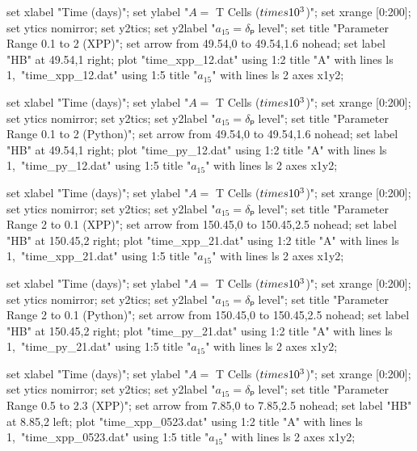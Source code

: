   set xlabel "Time (days)";
  set ylabel "$A = $ T Cells ($\\times 10^3$)";
  set xrange [0:200];
  set ytics nomirror;
  set y2tics;
  set y2label "$a_{15} = δₚ$ level";
  set title "Parameter Range 0.1 to 2 (XPP)";
  set arrow from 49.54,0 to 49.54,1.6 nohead;
  set label "HB" at 49.54,1 right;
  plot "time_xpp_12.dat" using 1:2 title "A" with lines ls 1,\
       "time_xpp_12.dat" using 1:5 title "$a_{15}$" with lines ls 2 axes x1y2;
\stopGNUPLOTscript

\startGNUPLOTscript[time_py_12]
  set xlabel "Time (days)";
  set ylabel "$A = $ T Cells ($\\times 10^3$)";
  set xrange [0:200];
  set ytics nomirror;
  set y2tics;
  set y2label "$a_{15} = δₚ$ level";
  set title "Parameter Range 0.1 to 2 (Python)";
  set arrow from 49.54,0 to 49.54,1.6 nohead;
  set label "HB" at 49.54,1 right;
  plot "time_py_12.dat" using 1:2 title "A" with lines ls 1,\
       "time_py_12.dat" using 1:5 title "$a_{15}$" with lines ls 2 axes x1y2;
\stopGNUPLOTscript

  set xlabel "Time (days)";
  set ylabel "$A = $ T Cells ($\\times 10^3$)";
  set xrange [0:200];
  set ytics nomirror;
  set y2tics;
  set y2label "$a_{15} = δₚ$ level";
  set title "Parameter Range 2 to 0.1 (XPP)";
  set arrow from 150.45,0 to 150.45,2.5 nohead;
  set label "HB" at 150.45,2 right;
  plot "time_xpp_21.dat" using 1:2 title "A" with lines ls 1,\
       "time_xpp_21.dat" using 1:5 title "$a_{15}$" with lines ls 2 axes x1y2;
\stopGNUPLOTscript

\startGNUPLOTscript[time_py_21]
  set xlabel "Time (days)";
  set ylabel "$A = $ T Cells ($\\times 10^3$)";
  set xrange [0:200];
  set ytics nomirror;
  set y2tics;
  set y2label "$a_{15} = δₚ$ level";
  set title "Parameter Range 2 to 0.1 (Python)";
  set arrow from 150.45,0 to 150.45,2.5 nohead;
  set label "HB" at 150.45,2 right;
  plot "time_py_21.dat" using 1:2 title "A" with lines ls 1,\
       "time_py_21.dat" using 1:5 title "$a_{15}$" with lines ls 2 axes x1y2;
\stopGNUPLOTscript

\startGNUPLOTscript[time_xpp_0523]
  set xlabel "Time (days)";
  set ylabel "$A = $ T Cells ($\\times 10^3$)";
  set xrange [0:200];
  set ytics nomirror;
  set y2tics;
  set y2label "$a_{15} = δₚ$ level";
  set title "Parameter Range 0.5 to 2.3 (XPP)";
  set arrow from 7.85,0 to 7.85,2.5 nohead;
  set label "HB" at 8.85,2 left;
  plot "time_xpp_0523.dat" using 1:2 title "A" with lines ls 1,\
       "time_xpp_0523.dat" using 1:5 title "$a_{15}$" with lines ls 2 axes x1y2;
\stopGNUPLOTscript


